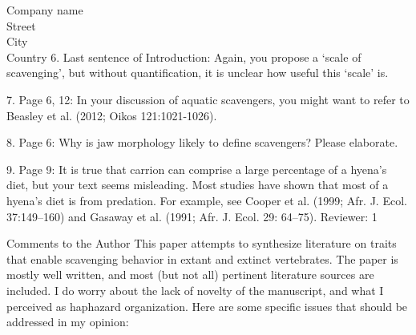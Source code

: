 \documentclass{letter}
\begin{document}
\begin{letter}{Company name \\ Street\\ City\\ Country}
6.      Last sentence of Introduction:  Again, you propose a ‘scale of scavenging’, but without quantification, it is unclear how useful this ‘scale’ is.

7.      Page 6, 12:  In your discussion of aquatic scavengers, you might want to refer to Beasley et al. (2012; Oikos 121:1021-1026).

8.      Page 6:  Why is jaw morphology likely to define scavengers?  Please elaborate.

9.      Page 9:  It is true that carrion can comprise a large percentage of a hyena’s diet, but your text seems misleading.  Most studies have shown that most of a hyena’s diet is from predation.  For example, see Cooper et al. (1999; Afr. J. Ecol. 37:149–160) and Gasaway et al. (1991; Afr. J. Ecol. 29: 64–75).
Reviewer: 1

Comments to the Author
This paper attempts to synthesize literature on traits that enable scavenging behavior in extant and extinct vertebrates.  The paper is mostly well written, and most (but not all) pertinent literature sources are included.  I do worry about the lack of novelty of the manuscript, and what I perceived as haphazard organization.  Here are some specific issues that should be addressed in my opinion:


\end{letter}
\end{document}
